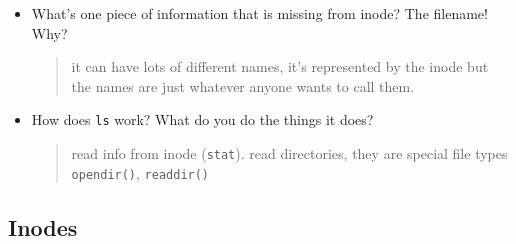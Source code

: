 \documentclass[]{article}
\newenvironment{Shaded}{}{}
\newcommand{\DecValTok}[1]{\textcolor[rgb]{0.25,0.63,0.44}{#1}}
\newcommand{\ControlFlowTok}[1]{\textcolor[rgb]{0.00,0.44,0.13}{\textbf{#1}}}
\newcommand{\NormalTok}[1]{#1}
\begin{document}
\begin{itemize}
\begin{Shaded}
\begin{Highlighting}[]
{{{{{{{{    \ControlFlowTok{return} \DecValTok{0}\NormalTok{;}
\NormalTok{\}}
\end{Highlighting}
\end{Shaded}
\item
  What's one piece of information that is missing from inode? The
  filename! Why?

  \begin{quote}
  it can have lots of different names, it's represented by the inode but
  the names are just whatever anyone wants to call them.
  \end{quote}
\item
  How does \texttt{ls} work? What do you do the things it does?

  \begin{quote}
  read info from inode (\texttt{stat}). read directories, they are
  special file types \texttt{opendir()}, \texttt{readdir()}
  \end{quote}
\end{itemize}

\subsection{\texorpdfstring{\textbf{Inodes}}{Inodes}}\label{header-n310}
\end{document}
